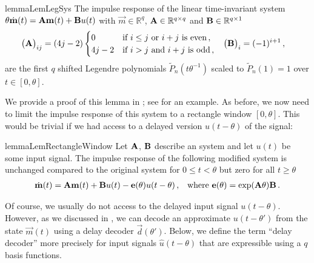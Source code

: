 \begin{restatable}{lemma}{LemLegSys}
The impulse response of the linear time-invariant system $\theta \dot{\mathbf{m}}(t) = {\mathbf{A}} \mathbf{m}(t) + {\mathbf{B}} u(t)$ with $\vec m \in \mathbb{R}^q$, ${\mathbf{A}} \in \mathbb{R}^{q \times q}$ and ${\mathbf{B}} \in \mathbb{R}^{q \times 1}$
\begin{align*}
	\begin{aligned}
	\big({\mathbf{A}}\big)_{ij} &= (4j - 2) \begin{cases}
			0 & \text{if } i \leq j \text{ or } i + j \text{ is even} \,, \\
			4j - 2 & \text{if } i > j \text{ and } i + j \text{ is odd} \,,
		\end{cases} &
	\big({\mathbf{B}}\big)_i &= (-1)^{i + 1} \,,
	\end{aligned}
\end{align*}
are the first $q$ shifted Legendre polynomials $\tilde P_n(t \theta^{-1})$ scaled to $\tilde P_n(1) = 1$ over $t \in [0, \theta]$.
\label{lem:leg_sys}
\end{restatable}
\noindent We provide a proof of this lemma in ; see  for an example.
As before, we now need to limit the impulse response of this system to a rectangle window $[0, \theta]$.
This would be trivial if we had access to a delayed version $u(t - \theta)$ of the signal:
\begin{restatable}{lemma}{LemRectangleWindow}
\label{lem:rectangle_window}
Let $\mathbf{A}$, $\mathbf{B}$ describe an \LTI system and let $u(t)$ be some input signal.
The impulse response of the following modified system is unchanged compared to the original \LTI system for $0 \leq t < \theta$ but zero for all $t \geq \theta$%
\begin{align*}
	\dot{\mathbf{m}}(t) &= \mathbf{A} \mathbf{m}(t) + \mathbf{B} u(t) - \mathbf{e}(\theta) u(t - \theta) \,, & \text{where } \mathbf{e}(\theta) = \exp(\mathbf{A} \theta) \mathbf{B} \,.
\end{align*}
\end{restatable}

Of course, we usually do not access to the delayed input signal $u(t - \theta)$.
However, as we discussed in , we can decode an approximate $u(t - \theta')$ from the state $\vec m(t)$ using a delay decoder $\vec d(\theta')$.
Below, we define the term \enquote{delay decoder} more precisely for input signals $\hat u(t - \theta)$ that are expressible using a $q$ basis functions.

